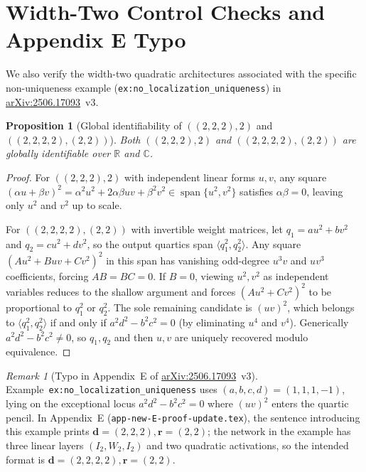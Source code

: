 \documentclass[11pt]{article}
\theoremstyle{plain}
\newtheorem{proposition}[theorem]{Proposition}
\theoremstyle{definition}
\theoremstyle{remark}
\newtheorem{remark}{Remark}
\DeclareMathOperator{\spn}{span}
\begin{document}
\section{Width-Two Control Checks and Appendix E Typo}

We also verify the width-two quadratic architectures associated with the specific non-uniqueness example (\texttt{ex:no\_localization\_uniqueness}) in \href{https://arxiv.org/abs/2506.17093}{arXiv:2506.17093}~v3.

\begin{proposition}[Global identifiability of $((2,2,2), 2)$ and $((2,2,2,2), (2,2))$]
Both $((2, 2, 2), 2)$ and $((2, 2, 2, 2), (2, 2))$ are globally identifiable over $\mathbb{R}$ and $\mathbb{C}$.
\end{proposition}

\begin{proof}
For $((2,2,2), 2)$ with independent linear forms $u, v$, any square $(\alpha u + \beta v)^2 = \alpha^2 u^2 + 2\alpha\beta uv + \beta^2 v^2 \in \spn\{u^2, v^2\}$ satisfies $\alpha\beta = 0$, leaving only $u^2$ and $v^2$ up to scale.

For $((2,2,2,2), (2,2))$ with invertible weight matrices, let $q_1 = a u^2 + b v^2$ and $q_2 = c u^2 + d v^2$, so the output quartics span $\langle q_1^2, q_2^2 \rangle$. Any square $(Au^2 + Buv + Cv^2)^2$ in this span has vanishing odd-degree $u^3v$ and $uv^3$ coefficients, forcing $AB = BC = 0$. If $B = 0$, viewing $u^2, v^2$ as independent variables reduces to the shallow argument and forces $(Au^2 + Cv^2)^2$ to be proportional to $q_1^2$ or $q_2^2$. The sole remaining candidate is $(uv)^2$, which belongs to $\langle q_1^2, q_2^2 \rangle$ if and only if $a^2 d^2 - b^2 c^2 = 0$ (by eliminating $u^4$ and $v^4$). Generically $a^2 d^2 - b^2 c^2 \neq 0$, so $q_1, q_2$ and then $u, v$ are uniquely recovered modulo equivalence.
\end{proof}

\begin{remark}[Typo in Appendix~E of \href{https://arxiv.org/abs/2506.17093}{arXiv:2506.17093}~v3]
Example~\texttt{ex:no\_localization\_uniqueness} uses $(a, b, c, d) = (1, 1, 1, -1)$, lying on the exceptional locus $a^2 d^2 - b^2 c^2 = 0$ where $(uv)^2$ enters the quartic pencil. In Appendix~E (\texttt{app-new-E-proof-update.tex}), the sentence introducing this example prints $\mathbf{d} = (2, 2, 2), \mathbf{r} = (2, 2)$; the network in the example has three linear layers $(I_2, W_2, I_2)$ and two quadratic activations, so the intended format is $\mathbf{d} = (2, 2, 2, 2), \mathbf{r} = (2, 2)$.
\end{remark}
\end{document}
